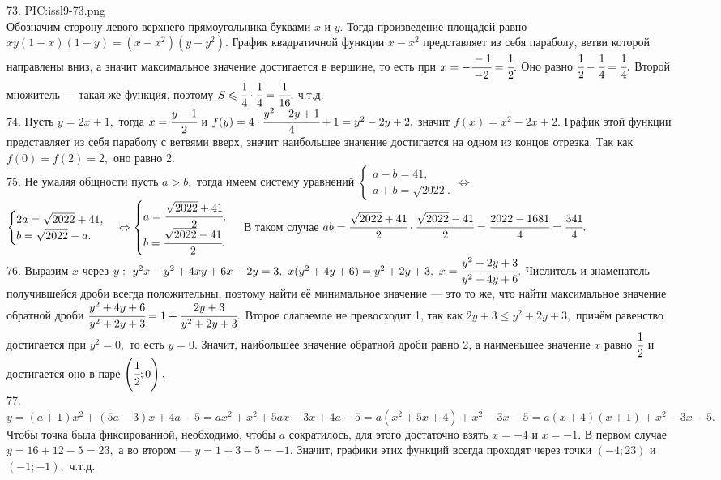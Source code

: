 73. {{PIC:issl9-73.png}}\\
Обозначим сторону левого верхнего прямоугольника буквами $x$ и $y.$ Тогда произведение площадей равно $xy(1-x)(1-y)=(x-x^2)(y-y^2).$ График квадратичной функции $x-x^2$ представляет из себя параболу, ветви которой направлены вниз, а значит максимальное значение достигается в вершине, то есть при $x=-\cfrac{-1}{-2}=\cfrac{1}{2}.$ Оно равно $\cfrac{1}{2}-\cfrac{1}{4}=\cfrac{1}{4}.$ Второй множитель --- такая же функция, поэтому $S\leqslant \cfrac{1}{4}\cdot \cfrac{1}{4}=\cfrac{1}{16},$ ч.т.д.\\
74. Пусть $y=2x+1,$ тогда $x=\cfrac{y-1}{2}$ и $f(y)=4\cdot\cfrac{y^2-2y+1}{4}+1=y^2-2y+2,$ значит $f(x)=x^2-2x+2.$ График этой функции представляет из себя параболу с ветвями вверх, значит наибольшее значение достигается на одном из концов отрезка. Так как $f(0)=f(2)=2,$ оно равно 2.\\
75. Не умаляя общности пусть $a>b,$ тогда имеем систему уравнений $\begin{cases} a-b=41,\\ a+b=\sqrt{2022}.\end{cases}\Leftrightarrow$\\$ \begin{cases} 2a=\sqrt{2022}+41,\\ b=\sqrt{2022}-a.\end{cases}\Leftrightarrow\begin{cases} a=\cfrac{\sqrt{2022}+41}{2},\\ b=\cfrac{\sqrt{2022}-41}{2}.\end{cases}$ В таком случае $ab=\cfrac{\sqrt{2022}+41}{2}\cdot\cfrac{\sqrt{2022}-41}{2}=\cfrac{2022-1681}{4}=\cfrac{341}{4}.$\\
76. Выразим $x$ через $y:\ y^2x-y^2+4xy+6x-2y=3,\ x(y^2+4y+6)=y^2+2y+3,\ x=\cfrac{y^2+2y+3}{y^2+4y+6}.$ Числитель и знаменатель получившейся дроби всегда положительны, поэтому найти её минимальное значение --- это то же, что найти максимальное значение обратной дроби $\cfrac{y^2+4y+6}{y^2+2y+3}=1+\cfrac{2y+3}{y^2+2y+3}.$ Второе слагаемое не превосходит 1, так как $2y+3\leqslant y^2+2y+3,$ причём равенство достигается при $y^2=0,$ то есть $y=0.$ Значит, наибольшее значение обратной дроби равно 2, а наименьшее значение $x$ равно $\cfrac{1}{2}$ и достигается оно в паре $\left(\cfrac{1}{2};0\right).$\\
77. $y=(a+1)x^2+(5a-3)x+4a-5=ax^2+x^2+5ax-3x+4a-5=a(x^2+5x+4)+x^2-3x-5=a(x+4)(x+1)+x^2-3x-5.$ Чтобы точка была фиксированной, необходимо, чтобы $a$ сократилось, для этого достаточно взять $x=-4$ и $x=-1.$ В первом случае $y=16+12-5=23,$ а во втором --- $y=1+3-5=-1.$ Значит, графики этих функций всегда проходят через точки $(-4;23)$ и $(-1;-1),$ ч.т.д.\\
